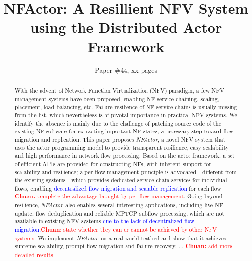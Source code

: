 \documentclass{sig-alternate-10pt}
\def\nfactor{\textit{NFActor}}
\newcommand{\chuan}[1]{\textcolor{red}{{\bf Chuan:} #1}}
\newcommand{\ac}[1]{\textcolor{blue}{#1}}
\begin{document}
\title{\Large \bf NFActor: A Resillient NFV System using the Distributed Actor Framework}


\author{
Paper \#44, xx pages
}

\maketitle

\begin{abstract}

With the advent of Network Function Virtualization (NFV) paradigm, a few NFV management systems have been proposed, enabling  NF service chaining, scaling, placement, load balancing, etc. Failure resilience of NF service chains is usually missing from the list, which nevertheless is of pivotal importance in practical NFV systems. We identify the absence is mainly due to the challenge of patching source code of the existing NF software for extracting important NF states, a necessary step toward flow migration and replication. %
 This paper proposes \nfactor, a novel NFV system that uses the actor programming model to provide transparent resilience, easy scalability and high performance in network flow processing. Based on the actor framework, a set of efficient APIs are provided for constructing NFs, with inherent support for scalability and resilience; a per-flow management principle is advocated - different from the existing systems - which provides dedicated service chain services for individual flows, enabling \ac{decentralized flow migration and scalable replication} for each flow \chuan{complete the advantage brought by per-flow management}. %
Going beyond resilience, \nfactor~also enables several interesting applications, including live NF update, flow deduplication and reliable MPTCP subflow processing, which are not available in existing NFV systems \ac{due to the lack of decentralized flow migration.}\chuan{state whether they can or cannot be achieved by other NFV systems}. We implement \nfactor~on a real-world testbed and show that it achieves supreme scalability, prompt flow migration and failure recovery, ... \chuan{add more detailed results}



\end{abstract}
\end{document}
